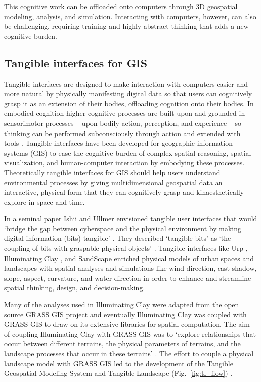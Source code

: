 \documentclass{isprs}
\begin{document}
This cognitive work can be offloaded onto computers through 3D geospatial modeling, analysis, and simulation. Interacting with computers, however, can also be challenging, requiring training and highly abstract thinking that adds a new cognitive burden.

\subsection{Tangible interfaces for GIS}
%
Tangible interfaces are designed to make interaction with computers easier and more natural
by physically manifesting digital data so that users can cognitively grasp it as an extension of their bodies, offloading cognition onto their bodies. 
%
In embodied cognition higher cognitive processes are built upon and grounded in sensorimotor processes -- upon bodily action, perception, and experience -- 
so thinking can be performed subconsciously through action and extended with tools 
\cite{Kirsh2013}. %
%
Tangible interfaces have been developed for geographic information systems (GIS) to ease the cognitive burden of complex spatial reasoning, spatial visualization, and human-computer interaction by embodying these processes. 
%
Theoretically tangible interfaces for GIS should help users understand environmental processes
by giving multidimensional geospatial data an interactive, physical form 
that they can cognitively grasp and kinaesthetically explore in space and time. 

In a seminal paper Ishii and Ullmer envisioned tangible user interfaces that would 
`bridge the gap between cyberspace and the physical environment by making digital information (bits) tangible' \cite{Ishii1997}.
They described `tangible bits' as `the coupling of bits with graspable physical objects' \cite{Ishii1997}. 
Tangible interfaces like 
Urp \cite{Underkoffler1999}, Illuminating Clay \cite{Piper2002}, and SandScape \cite{Ratti2004} 
enriched physical models of urban spaces and landscapes with spatial analyses and simulations 
like wind direction, cast shadow, slope, aspect, curvature, and water direction
in order to enhance and streamline spatial thinking, design, and decision-making.

Many of the analyses used in Illuminating Clay were adapted from the open source GRASS GIS project \cite{Piper2002a} 
and eventually 
Illuminating Clay was coupled with GRASS GIS 
to draw on its extensive libraries for spatial computation. 
The aim of coupling Illuminating Clay with GRASS GIS was to 
`explore relationships that occur between different terrains, the physical parameters of terrains, and the landscape processes that occur in these terrains' \cite{Mitasova2006}. 
%
The effort to couple a physical landscape model with GRASS GIS led to the development of 
the Tangible Geospatial Modeling System \cite{Tateosian2010} and Tangible Landscape (Fig.~\ref{fig:tl_flow}) \cite{Petrasova2014,Petrasova2015}.
\end{document}
